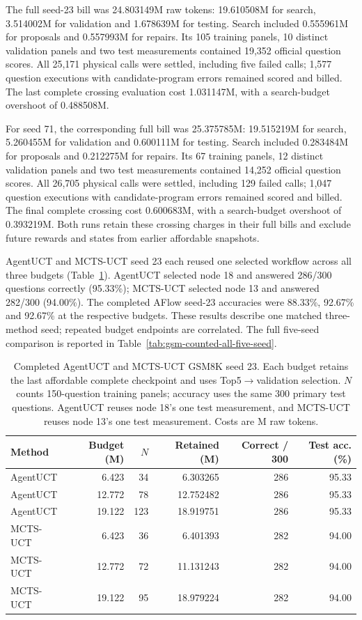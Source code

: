 The full seed-23 bill was 24.803149M raw tokens: 19.610508M for search,
3.514002M for validation and 1.678639M for testing. Search included
0.555961M for proposals and 0.557993M for repairs. Its 105 training panels,
10 distinct validation panels and two test measurements contained 19,352
official question scores. All 25,171 physical calls were settled, including
five failed calls; 1,577 question executions with candidate-program errors
remained scored and billed. The last complete crossing evaluation cost
1.031147M, with a search-budget overshoot of 0.488508M.

For seed 71, the corresponding full bill was 25.375785M: 19.515219M for
search, 5.260455M for validation and 0.600111M for testing. Search included
0.283484M for proposals and 0.212275M for repairs. Its 67 training panels,
12 distinct validation panels and two test measurements contained 14,252
official question scores. All 26,705 physical calls were settled, including
129 failed calls; 1,047 question executions with candidate-program errors
remained scored and billed. The final complete crossing cost 0.600683M,
with a search-budget overshoot of 0.393219M. Both runs retain these crossing
charges in their full bills and exclude future rewards and states from
earlier affordable snapshots.

AgentUCT and MCTS-UCT seed 23 each reused one selected workflow across
all three budgets (Table~\ref{tab:gsm-counted-agentuct-seed23}). AgentUCT
selected node 18 and answered 286/300 questions correctly (95.33\%);
MCTS-UCT selected node 13 and answered 282/300 (94.00\%). The completed
AFlow seed-23 accuracies were 88.33\%, 92.67\% and 92.67\% at the respective
budgets. These results describe one matched three-method seed; repeated
budget endpoints are correlated. The full five-seed comparison is reported
in Table~\ref{tab:gsm-counted-all-five-seed}.

\begin{table}[t]
\centering\small
\caption{Completed AgentUCT and MCTS-UCT GSM8K seed 23. Each budget retains
the last affordable complete checkpoint and uses Top5$\to$validation selection.
$N$ counts 150-question training panels; accuracy uses the same 300 primary
test questions. AgentUCT reuses node 18's one test measurement, and MCTS-UCT
reuses node 13's one test measurement. Costs are M raw tokens.}
\label{tab:gsm-counted-agentuct-seed23}
\setlength{\tabcolsep}{4pt}
\begin{tabular}{@{}lrrrrr@{}}
\toprule
Method & Budget (M) & $N$ & Retained (M) & Correct / 300 & Test acc. (\%)\\
\midrule
AgentUCT & 6.423 & 34 & 6.303265 & 286 & 95.33\\
AgentUCT & 12.772 & 78 & 12.752482 & 286 & 95.33\\
AgentUCT & 19.122 & 123 & 18.919751 & 286 & 95.33\\
MCTS-UCT & 6.423 & 36 & 6.401393 & 282 & 94.00\\
MCTS-UCT & 12.772 & 72 & 11.131243 & 282 & 94.00\\
MCTS-UCT & 19.122 & 95 & 18.979224 & 282 & 94.00\\
\bottomrule
\end{tabular}
\end{table}

